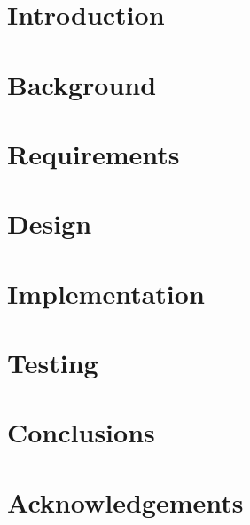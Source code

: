 \documentclass[12pt, twoside]{report}
\begin{document}
  

  \newpage
  \thispagestyle{empty}
  \mbox{}
  \newpage

  \setcounter{page}{1}
  

  \tableofcontents
  \clearpage

  \chapter{Introduction} \label{introduction}
    

  \chapter{Background} \label{background}
    

  \chapter{Requirements} \label{requirements}
    

  \chapter{Design} \label{design}
    

  \chapter{Implementation} \label{implementation}
    

  \chapter{Testing} \label{testing}
    

  \chapter{Conclusions} \label{conclusions}
    

  \chapter*{Acknowledgements} \label{acknowledgements}
    

  \clearpage
  \appendix
\end{document}
